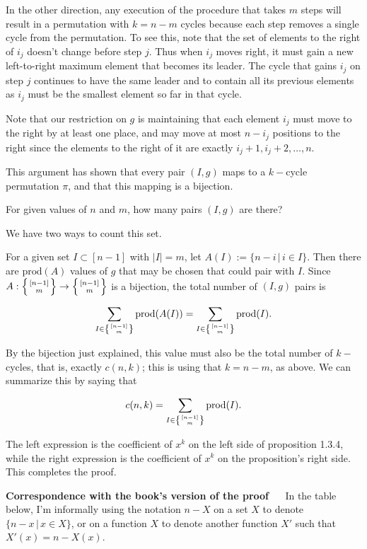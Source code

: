\documentclass[]{article}
\begin{document}
In the other direction, any execution of the procedure that takes \(m\)
steps will result in a permutation with \(k=n-m\) cycles because each
step removes a single cycle from the permutation. To see this, note that
the set of elements to the right of \(i_j\) doesn't change before step
\(j\). Thus when \(i_j\) moves right, it must gain a new left-to-right
maximum element that becomes its leader. The cycle that gains \(i_j\) on
step \(j\) continues to have the same leader and to contain all its
previous elements as \(i_j\) must be the smallest element so far in that
cycle.

Note that our restriction on \(g\) is maintaining that each element
\(i_j\) must move to the right by at least one place, and may move at
most \(n-i_j\) positions to the right since the elements to the right of
it are exactly \(i_j + 1, i_j + 2, \ldots, n\).

This argument has shown that every pair \((I, g)\) maps to a \(k-\)cycle
permutation \(\pi\), and that this mapping is a bijection.

For given values of \(n\) and \(m\), how many pairs \((I, g)\) are
there?

We have two ways to count this set.

For a given set \(I\subset [n-1]\) with \(|I| = m\), let
\(A(I):=\{n - i \, | \, i \in I\}\). Then there are \(\text{prod}(A)\)
values of \(g\) that may be chosen that could pair with \(I\). Since
\(A: \left\{{[n-1]\atop m}\right\} \to \left\{{[n-1]\atop m}\right\}\)
is a bijection, the total number of \((I, g)\) pairs is

\[\sum_{I \in \left\{{[n-1]\atop m}\right\}} \text{prod}(A(I)) =
  \sum_{I \in \left\{{[n-1]\atop m}\right\}} \text{prod}(I).\]

By the bijection just explained, this value must also be the total
number of \(k-\)cycles, that is, exactly \(c(n, k)\); this is using that
\(k=n-m\), as above. We can summarize this by saying that

\[c(n, k) = \sum_{I \in \left\{{[n-1]\atop m}\right\}} \text{prod}(I).\]

The left expression is the coefficient of \(x^k\) on the left side of
proposition 1.3.4, while the right expression is the coefficient of
\(x^k\) on the proposition's right side. This completes the proof.

\textbf{Correspondence with the book's version of the proof} \(\quad\)
In the table below, I'm informally using the notation \(n-X\) on a set
\(X\) to denote \(\{n-x \,|\, x\in X\}\), or on a function \(X\) to
denote another function \(X'\) such that \(X'(x) = n - X(x)\).
\end{document}
